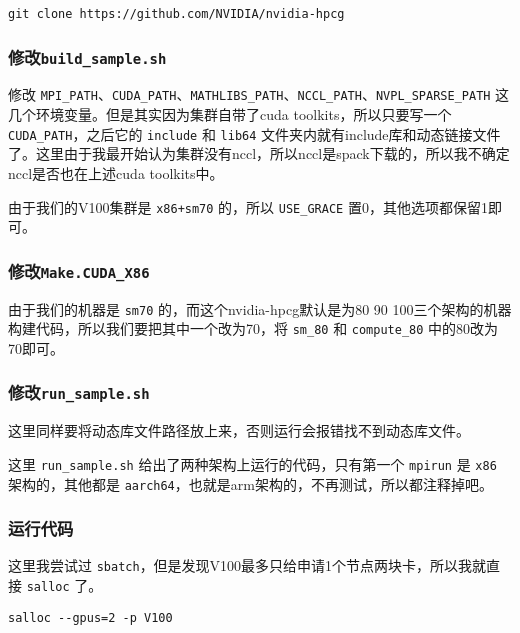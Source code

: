 \documentclass[a4paper,12pt,scheme=plain]{ctexart}
\newcommand{\inlinecode}[1]{\colorbox{gray!10}{\lstinline|#1|}}
\numberwithin{equation}{section} %
\begin{document}
\begin{lstlisting}[style=bash]
git clone https://github.com/NVIDIA/nvidia-hpcg
\end{lstlisting}

\subsubsection{修改\texttt{build\_sample.sh}}

修改 \inlinecode{MPI_PATH}、\inlinecode{CUDA_PATH}、\inlinecode{MATHLIBS_PATH}、\inlinecode{NCCL_PATH}、\inlinecode{NVPL_SPARSE_PATH} 这几个环境变量。但是其实因为集群自带了cuda toolkits，所以只要写一个 \inlinecode{CUDA_PATH}，之后它的 \inlinecode{include} 和 \inlinecode{lib64} 文件夹内就有include库和动态链接文件了。这里由于我最开始认为集群没有nccl，所以nccl是spack下载的，所以我不确定nccl是否也在上述cuda toolkits中。

由于我们的V100集群是 \inlinecode{x86+sm70} 的，所以 \inlinecode{USE_GRACE} 置0，其他选项都保留1即可。

\subsubsection{修改\texttt{Make.CUDA\_X86}}

由于我们的机器是 \inlinecode{sm70} 的，而这个nvidia-hpcg默认是为80 90 100三个架构的机器构建代码，所以我们要把其中一个改为70，将 \inlinecode{sm_80} 和 \inlinecode{compute_80} 中的80改为70即可。

\subsubsection{修改\texttt{run\_sample.sh}}

这里同样要将动态库文件路径放上来，否则运行会报错找不到动态库文件。

这里 \inlinecode{run_sample.sh} 给出了两种架构上运行的代码，只有第一个 \inlinecode{mpirun} 是 \inlinecode{x86} 架构的，其他都是 \inlinecode{aarch64}，也就是arm架构的，不再测试，所以都注释掉吧。

\subsubsection{运行代码}

这里我尝试过 \inlinecode{sbatch}，但是发现V100最多只给申请1个节点两块卡，所以我就直接 \inlinecode{salloc} 了。

\begin{lstlisting}[style=bash]
salloc --gpus=2 -p V100
\end{lstlisting}
\end{document}
